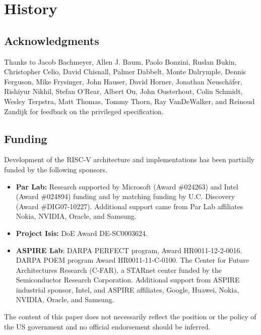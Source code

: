 \chapter{History}

\section*{Acknowledgments}

Thanks to Jacob Bachmeyer,
Allen J. Baum, Paolo Bonzini, Ruslan Bukin, Christopher Celio, David
Chisnall, Palmer Dabbelt, Monte Dalrymple, Dennis Ferguson, Mike
Frysinger, John Hauser, David Horner,
Jonathan Neusch{\"a}fer, Rishiyur Nikhil, Stefan O'Rear,
Albert Ou, John Ousterhout, Colin Schmidt, Wesley Terpstra, Matt
Thomas, Tommy Thorn, Ray VanDeWalker, and Reinoud Zandijk for feedback
on the privileged specification.

\section{Funding}

Development of the RISC-V architecture and implementations has been
partially funded by the following sponsors.
\begin{itemize}
\item {\bf Par Lab:} Research supported by Microsoft (Award \#024263)
  and Intel (Award \#024894) funding and by matching funding by
  U.C. Discovery (Award \#DIG07-10227). Additional support came from
  Par Lab affiliates Nokia, NVIDIA, Oracle, and Samsung.

\item {\bf Project Isis:} DoE Award DE-SC0003624.

\item {\bf ASPIRE Lab}: DARPA PERFECT program, Award HR0011-12-2-0016.
  DARPA POEM program Award HR0011-11-C-0100.  The Center for Future
  Architectures Research (C-FAR), a STARnet center funded by the
  Semiconductor Research Corporation.  Additional support from ASPIRE
  industrial sponsor, Intel, and ASPIRE affiliates, Google, Huawei,
  Nokia, NVIDIA, Oracle, and Samsung.
\end{itemize}

The content of this paper does not necessarily reflect the position or the
policy of the US government and no official endorsement should be
inferred. 
